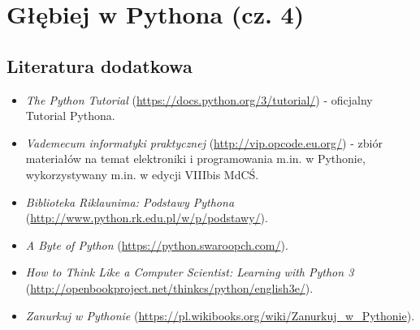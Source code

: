 \documentclass{pdfBooklets}
\begin{document}
\section{Głębiej w Pythona (cz. 4)}

\subsection{Literatura dodatkowa {\Symbola 🤔}}

\begin{itemize}
\item \emph{The Python Tutorial} (\url{https://docs.python.org/3/tutorial/}) - oficjalny Tutorial Pythona.
\item \emph{Vademecum informatyki praktycznej} (\url{http://vip.opcode.eu.org/}) - zbiór materiałów na temat elektroniki i programowania m.in. w Pythonie, wykorzystywany m.in. w edycji VIIIbis MdCŚ.
\item \emph{Biblioteka Riklaunima: Podstawy Pythona} (\url{http://www.python.rk.edu.pl/w/p/podstawy/}).
\item \emph{A Byte of Python} (\url{https://python.swaroopch.com/}).
\item \emph{How to Think Like a Computer Scientist: Learning with Python 3} (\url{http://openbookproject.net/thinkcs/python/english3e/}).
\item \emph{Zanurkuj w Pythonie} (\url{https://pl.wikibooks.org/wiki/Zanurkuj_w_Pythonie}).
\end{itemize}

\rozwiazania

\end{document}
